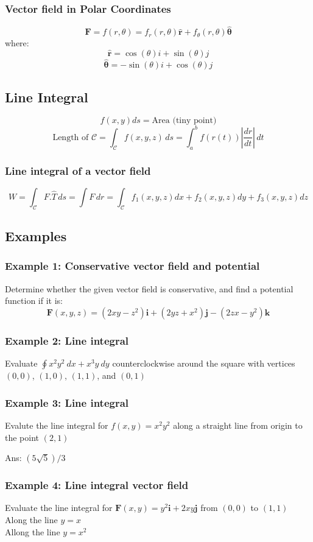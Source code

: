 \subsubsection{Vector field in Polar Coordinates}
$$\mathbf{F}=f(r,\theta)=f_{r}(r,\theta)\mathbf{\hat{r}}+f_{\theta}(r,\theta)\mathbf{\hat{\theta}}$$
where:
$$\mathbf{\hat{r}}=\cos(\theta)i+\sin(\theta)j$$
$$\mathbf{\hat{\theta}}=-\sin(\theta)i+\cos(\theta)j$$
\subsection{Line Integral}
$$f(x,y)ds=\text{Area (tiny point)}$$
$$\text{Length of }\mathcal{C}=\int _{\mathcal{C}}f(x,y,z) \, ds=\int_{a}^{b}f(r(t)) \left|\frac{ dr }{ dt } \right| \, dt  $$
\subsubsection{Line integral of a vector field}
$$W=\int _{\mathcal{C}}F.\hat{T} \, ds =\int F \,dr =\int _{\mathcal{C}}f_{1}(x,y,z)dx+f_{2}(x,y,z)dy+f_{3}(x,y,z)dz $$
\subsection{Examples}
\subsubsection{Example 1: Conservative vector field and potential}
Determine whether the given vector field is conservative, and find a potential
function if it is:
$$\mathbf{F}(x,y,z)=( 2x y-z^{2})\mathbf{i}+( 2y z+ x^{2})\mathbf{j}-(2z x- y^{2})\mathbf{k}$$ 
\subsubsection{Example 2: Line integral}
Evaluate $\oint x^2y^2 \ dx + x^3y\ dy$ counterclockwise around the square with vertices
$(0,0)$, $(1,0)$, $(1, 1)$, and $(0, 1)$
\subsubsection{Example 3: Line integral}
Evalute the line integral for $f(x,y)=x^2y^2$ along a straight line from origin to the point $(2,1)$

Ans: $(5\sqrt{5})/3$
\subsubsection{Example 4: Line integral vector field}
Evaluate the line integral for $\mathbf{F}(x,y)=y^2\mathbf{i}+2xy\mathbf{j}$ from $(0,0)$ to $(1,1)$\\
Along the line $y=x$\\
Allong the line $y=x^2$


